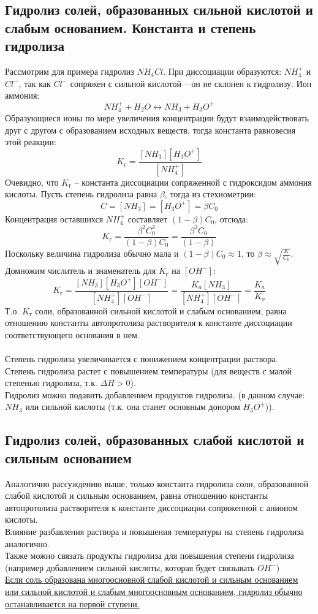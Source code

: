 \documentclass[14pt,a4paper]{scrartcl}
\begin{document}
\subsection*{Гидролиз солей, образованных сильной кислотой и слабым основанием. Константа и степень гидролиза}
Рассмотрим для примера гидролиз $NH_4Cl$. При диссоциации образуются: $NH_4^+ $ и $Cl^-$, так как $Cl^-$ сопряжен с сильной кислотой -- он не склонен к гидролизу. Ион аммония:
$$ NH_4^+ + H_2O \leftrightarrow NH_3 + H_3O^+  $$
Образующиеся ионы по мере увеличения концентрации будут взаимодействовать друг с другом с образованием исходных веществ, тогда константа равновесия этой реакции:
$$ K_{\text{г}} = \dfrac{[NH_3][H_3O^+]}{[NH_4^+]} $$
Очевидно, что $ K_{\text{г}}$ -- константа диссоциации сопряженной с гидроксидом аммония кислоты. Пусть степень гидролиза равна $\beta$, тогда  из стехиометрии:
$$ C = [NH_3] = [H_3O^+] = \beta C_0 $$
Концентрация оставшихся $NH_4^+$ составляет $(1-\beta)C_0$, отсюда:
$$ K_{\text{г}} = \dfrac{\beta^2 C_0^2}{(1-\beta)C_0} = \dfrac{\beta^2C_0}{(1-\beta)} $$
Поскольку величина гидролиза обычно мала и $(1-\beta)C_0 \approx 1 $, то $ \beta \approx \sqrt{\frac{K}{C_0}}$. \\
Домножим числитель и знаменатель для $ K_{\text{г}} $ на $[OH^-] $:
$$ K_{\text{г}} = \dfrac{[NH_3][H_3O^+][OH^-]}{[NH_4^+][OH^-]} = \dfrac{K_a[NH_3]}{[NH_4^+][OH^-]} = \dfrac{K_a}{K_o}   $$
Т.о. $ K_{\text{г}}$ соли, образованной сильной кислотой и слабым основанием, равна отношению константы автопротолиза растворителя к константе диссоциации соответствующего основания в нем. \\ \\
Степень гидролиза увеличивается с понижением концентрации раствора. \\
Степень гидролиза растет с повышением температуры (для веществ с малой степенью гидролиза, т.к. $\Delta{H} > 0$). \\
Гидролиз можно подавить добавлением продуктов гидролиза. (в данном случае: $NH_3$ или сильной кислоты (т.к. она станет основным донором $H_3O^+$)).
 
\subsection*{Гидролиз солей, образованных слабой кислотой и сильным основанием}
Аналогично рассуждению выше, только константа гидролиза соли, образованной слабой кислотой и сильным основанием, равна отношению константы автопротолиза растворителя к константе диссоциации сопряженной с анионом кислоты. \\
Влияние разбавления раствора и повышения температуры на степень гидролиза аналогично. \\
Также  можно связать продукты гидролиза для повышения степени гидролиза (например добавлением сильной кислоты, которая будет связывать $OH^-$)\\
\ul{Если соль образована многоосновной слабой кислотой и сильным основанием или сильной кислотой и слабым многоосновным основанием, гидролиз обычно останавливается на первой ступени.} \\
\end{document}
